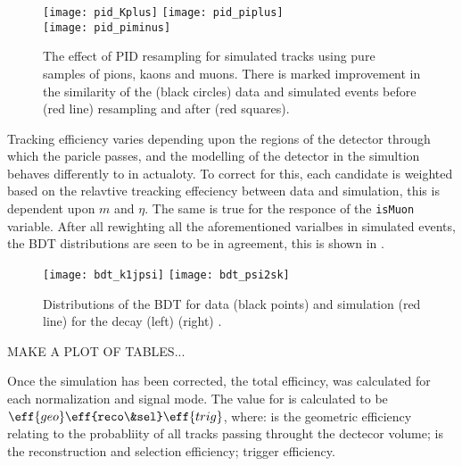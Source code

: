 \begin{figure}
  \begin{center}
    \texttt{[image: pid\_Kplus]}
    \texttt{[image: pid\_piplus]}\\
    \texttt{[image: pid\_piminus]}
    \caption{\small
      The effect of PID resampling for simulated tracks using pure samples of pions, kaons and
      muons.
      There is marked improvement in the similarity of the (black circles) \btojpsikpipi data and
      simulated events before (red line) resampling and after (red squares).
    }
    \label{fig:hhh:pid}
  \end{center}
\end{figure}


Tracking efficiency varies depending upon the regions of the detector through which the paricle
passes, and the modelling of the detector in the simultion behaves differently to in actualoty.
To correct for this, each candidate is weighted based on the relavtive treacking effeciency between
data and simulation, this is dependent upon $m$ and $\eta$.
The same is true for the responce of the {\tt isMuon} variable.
After all rewighting all the aforementioned varialbes in simulated events, the BDT distributions
are seen to be in agreement, this is shown in .

\begin{figure}
  \begin{center}
    \texttt{[image: bdt\_k1jpsi]}
    \texttt{[image: bdt\_psi2sk]}
    \caption{\small
      Distributions of the BDT for data (black points) and simulation (red line) for the decay
      (left) 
      (right) \btopsitwosk.
    }
    \label{fig:kpipi:bdt}
  \end{center}
\end{figure}

MAKE A PLOT OF TABLES...

Once the simulation has been corrected, the total efficincy,  was calculated for each
normalization and signal mode.
The value for  is calculated to be $\eff{geo}\eff{reco\&sel}\eff{trig}$, where:
 is the geometric efficiency relating to the probabliity of all tracks passing throught
the \lhcb dectecor volume;
 is the reconstruction and selection efficiency;
 trigger efficiency.

